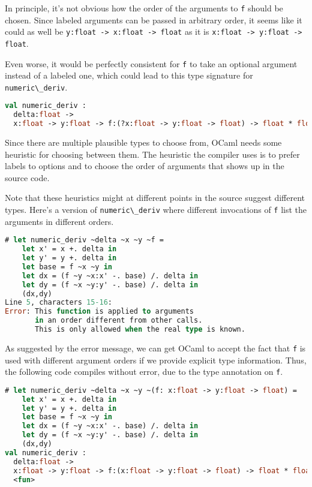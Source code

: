 In principle, it's not obvious how the order of the arguments to
\passthrough{\lstinline!f!} should be chosen. Since labeled arguments
can be passed in arbitrary order, it seems like it could as well be
\passthrough{\lstinline!y:float -> x:float -> float!} as it is
\passthrough{\lstinline!x:float -> y:float -> float!}.

Even worse, it would be perfectly consistent for
\passthrough{\lstinline!f!} to take an optional argument instead of a
labeled one, which could lead to this type signature for
\passthrough{\lstinline!numeric\_deriv!}.

\begin{lstlisting}[language=Caml]
val numeric_deriv :
  delta:float ->
  x:float -> y:float -> f:(?x:float -> y:float -> float) -> float * float
\end{lstlisting}

Since there are multiple plausible types to choose from, OCaml needs
some heuristic for choosing between them. The heuristic the compiler
uses is to prefer labels to options and to choose the order of arguments
that shows up in the source code.

Note that these heuristics might at different points in the source
suggest different types. Here's a version of
\passthrough{\lstinline!numeric\_deriv!} where different invocations of
\passthrough{\lstinline!f!} list the arguments in different orders.

\begin{lstlisting}[language=Caml]
# let numeric_deriv ~delta ~x ~y ~f =
    let x' = x +. delta in
    let y' = y +. delta in
    let base = f ~x ~y in
    let dx = (f ~y ~x:x' -. base) /. delta in
    let dy = (f ~x ~y:y' -. base) /. delta in
    (dx,dy)
Line 5, characters 15-16:
Error: This function is applied to arguments
       in an order different from other calls.
       This is only allowed when the real type is known.
\end{lstlisting}

As suggested by the error message, we can get OCaml to accept the fact
that \passthrough{\lstinline!f!} is used with different argument orders
if we provide explicit type information. Thus, the following code
compiles without error, due to the type annotation on
\passthrough{\lstinline!f!}.

\begin{lstlisting}[language=Caml]
# let numeric_deriv ~delta ~x ~y ~(f: x:float -> y:float -> float) =
    let x' = x +. delta in
    let y' = y +. delta in
    let base = f ~x ~y in
    let dx = (f ~y ~x:x' -. base) /. delta in
    let dy = (f ~x ~y:y' -. base) /. delta in
    (dx,dy)
val numeric_deriv :
  delta:float ->
  x:float -> y:float -> f:(x:float -> y:float -> float) -> float * float =
  <fun>
\end{lstlisting}

